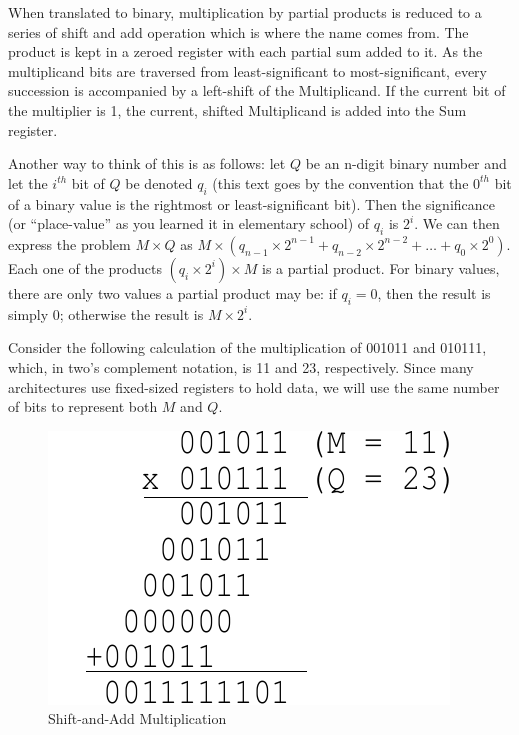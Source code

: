 \documentclass{article}
\begin{document}
When translated to binary, multiplication by partial products is reduced to a series of shift and add operation which is where the name comes from.
The product is kept in a zeroed register with each partial sum added to it.
As the multiplicand bits are traversed from least-significant to most-significant, every succession is accompanied by a left-shift of the Multiplicand.
If the current bit of the multiplier is 1, the current, shifted Multiplicand is added into the Sum register.

Another way to think of this is as follows: let $Q$ be an n-digit binary number and let the $i^{th}$ bit of $Q$ be denoted $q_i$ (this text goes by the convention that the $0^{th}$ bit of a binary value is the rightmost or least-significant bit).
Then the significance (or ``place-value'' as you learned it in elementary school) of $q_i$ is $2^i$.
We can then express the problem $M \times Q$ as $M \times (q_{n-1} \times 2^{n-1} + q_{n-2} \times 2^{n-2} + \ldots + q_{0} \times 2^{0})$.
Each one of the products $(q_i \times 2^{i}) \times M$ is a partial product.
For binary values, there are only two values a partial product may be: if $q_i = 0$, then the result is simply $0$; otherwise the result is $M \times 2^i$.

Consider the following calculation of the multiplication of 001011 and 010111, which, in two's complement notation, is 11 and 23, respectively.
Since many architectures use fixed-sized registers to hold data, we will use the same number of bits to represent both $M$ and $Q$.
\pagebreak
\begin{figure}
\centering
\includegraphics[scale=0.7]{saam3.pdf}
\caption{Shift-and-Add Multiplication}
\end{figure}
\end{document}
